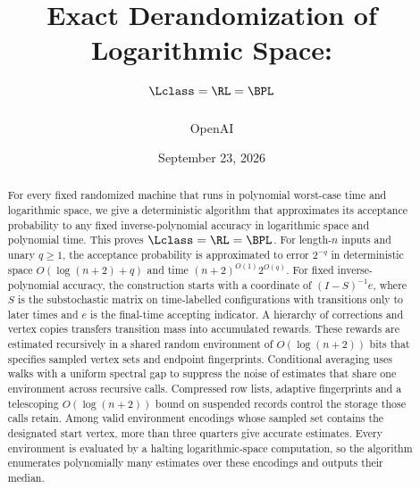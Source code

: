\documentclass[11pt]{article}
\title{Exact Derandomization of Logarithmic Space:\protect\\
  $\Lclass=\RL=\BPL$}
\author{OpenAI}
\date{September 23, 2026}
\begin{document}
\maketitle
\begin{abstract}
For every fixed randomized machine that runs in polynomial worst-case time
and logarithmic space, we give a deterministic algorithm that approximates
its acceptance probability to any fixed inverse-polynomial accuracy in
logarithmic space and polynomial time. This proves $\Lclass=\RL=\BPL$.
For length-$n$ inputs and unary $q\ge1$, the acceptance probability is
approximated to error $2^{-q}$ in deterministic space $O(\log(n+2)+q)$ and
time $(n+2)^{O(1)}2^{O(q)}$.
For fixed inverse-polynomial accuracy, the construction starts with a
coordinate of $(I-S)^{-1}e$, where $S$ is the
substochastic matrix on time-labelled configurations with transitions only to later times and $e$ is the
final-time accepting indicator. A hierarchy of corrections and vertex
copies transfers transition mass into accumulated rewards. These rewards
are estimated recursively in a shared random environment of
$O(\log(n+2))$ bits that specifies sampled vertex sets and endpoint
fingerprints. Conditional averaging uses walks with a uniform spectral
gap to suppress the noise of estimates that share one environment across
recursive calls. Compressed row lists, adaptive fingerprints and a
telescoping $O(\log(n+2))$ bound on suspended records control the storage
those calls retain.
Among valid environment encodings whose sampled set contains the
designated start vertex, more than three quarters give accurate estimates.
Every environment is evaluated by a halting logarithmic-space computation,
so the algorithm enumerates polynomially many estimates over these
encodings and outputs their median.
\end{abstract}

\tableofcontents
\clearpage

















\end{document}
